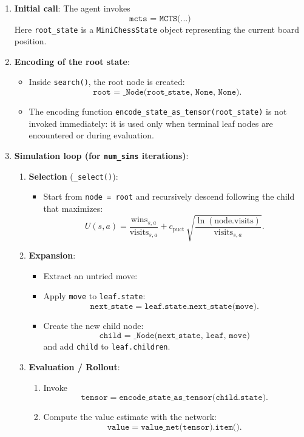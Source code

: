 \documentclass{report}
\begin{document}
\begin{enumerate}
  \item \textbf{Initial call}: The agent invokes  
    \[
      \texttt{mcts = MCTS(...)}
    \]
    Here \texttt{root\_state} is a \texttt{MiniChessState} object representing the current board position.

  \item \textbf{Encoding of the root state}:
    \begin{itemize}
      \item Inside \texttt{search()}, the root node is created:  
        \[
          \texttt{root = \_Node(root\_state, None, None).}
        \]
      \item The encoding function \texttt{encode\_state\_as\_tensor(root\_state)} is not invoked immediately: it is used only when terminal leaf nodes are encountered or during evaluation.
    \end{itemize}

  \item \textbf{Simulation loop (for \texttt{num\_sims} iterations)}:
    \begin{enumerate}
      \item \textbf{Selection} (\texttt{\_select()}):
        \begin{itemize}
          \item Start from \texttt{node = root} and recursively descend following the child that maximizes:
            \[
              U(s,a) = \frac{\text{wins}_{s,a}}{\text{visits}_{s,a}} + c_{\text{puct}} \,\sqrt{\frac{\ln(\text{node.visits})}{\text{visits}_{s,a}}}.
            \]
        \end{itemize}

      \item \textbf{Expansion}:
        \begin{itemize}
          \item Extract an untried move:  
          \item Apply \texttt{move} to \texttt{leaf.state}:  
            \[
              \texttt{next\_state} = \texttt{leaf.state.next\_state(move)}.
            \]
          \item Create the new child node:  
            \[
              \texttt{child = \_Node(next\_state, leaf, move)} 
            \]  
            and add \texttt{child} to \texttt{leaf.children}.
        \end{itemize}

      \item \textbf{Evaluation / Rollout}:
            \begin{enumerate}
              \item Invoke  
                \[
                  \texttt{tensor} = \texttt{encode\_state\_as\_tensor(child.state)}.
                \]
             \item Compute the value estimate with the network:
                \[
                  \texttt{value} = \texttt{value\_net(tensor).item()}.
                \]
            \end{enumerate}


\end{enumerate}
\end{enumerate}
\end{document}
